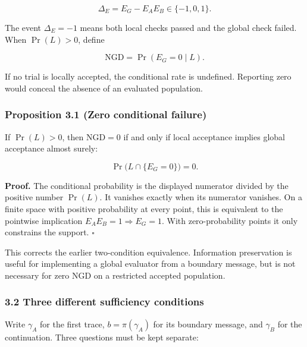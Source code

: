 \documentclass[
  10pt,
]{article}
\begin{document}
\hypertarget{math-E0025-0025}{}{\[\Delta_E=E_G-E_AE_B\in\{-1,0,1\}.\]}

The event \hypertarget{math-E0026-0026}{}{\(\Delta_E=-1\)} means both local checks passed and the global check failed. When \hypertarget{math-E0027-0027}{}{\(\Pr(L)>0\)}, define

\hypertarget{math-E0028-0028}{}{\[\mathrm{NGD}=\Pr(E_G=0\mid L).\]}

If no trial is locally accepted, the conditional rate is undefined. Reporting zero would conceal the absence of an evaluated population.

\subsubsection{Proposition 3.1 (Zero conditional failure)}\label{claim-zero-ngd}

If \hypertarget{math-E0027-0029}{}{\(\Pr(L)>0\)}, then \hypertarget{math-E0029-0030}{}{\(\mathrm{NGD}=0\)} if and only if local acceptance implies global acceptance almost surely:

\hypertarget{math-E0030-0031}{}{\[\Pr\bigl(L\cap\{E_G=0\}\bigr)=0.\]}

\textbf{Proof.} The conditional probability is the displayed numerator divided by the positive number \hypertarget{math-E0031-0032}{}{\(\Pr(L)\)}. It vanishes exactly when its numerator vanishes. On a finite space with positive probability at every point, this is equivalent to the pointwise implication \hypertarget{math-E0032-0033}{}{\(E_AE_B=1\Rightarrow E_G=1\)}. With zero-probability points it only constrains the support. \hypertarget{math-E0033-0034}{}{\(\square\)}

This corrects the earlier two-condition equivalence. Information preservation is useful for implementing a global evaluator from a boundary message, but is not necessary for zero NGD on a restricted accepted population.

\subsubsection{3.2 Three different sufficiency conditions}\label{three-different-sufficiency-conditions}

Write \hypertarget{math-E0034-0035}{}{\(\gamma_A\)} for the first trace, \hypertarget{math-E0035-0036}{}{\(b=\pi(\gamma_A)\)} for its boundary message, and \hypertarget{math-E0036-0037}{}{\(\gamma_B\)} for the continuation. Three questions must be kept separate:
\end{document}
